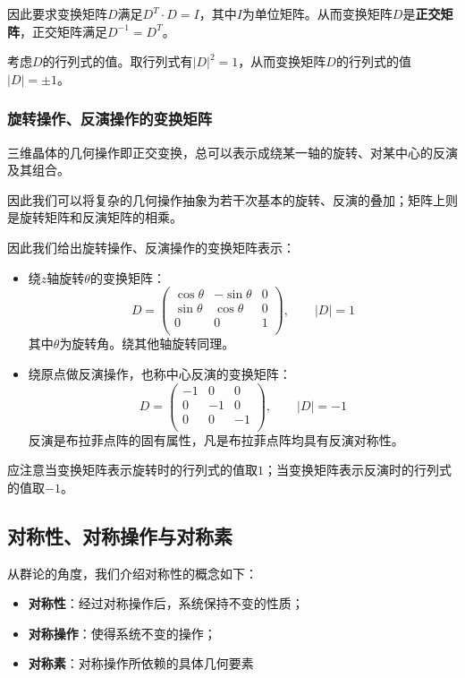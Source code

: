     因此要求变换矩阵$D$满足$D^T\cdot D = I$，其中$I$为单位矩阵。从而变换矩阵$D$是\textbf{正交矩阵}，正交矩阵满足$D^{-1}=D^T$。

    考虑$D$的行列式的值。取行列式有$\left\lvert D\right\rvert^2=1$，从而变换矩阵$D$的行列式的值$\left\lvert D\right\rvert= \pm 1$。

\subsubsection{旋转操作、反演操作的变换矩阵}
    三维晶体的几何操作即正交变换，总可以表示成绕某一轴的旋转、对某中心的反演及其组合。
    
    因此我们可以将复杂的几何操作抽象为若干次基本的旋转、反演的叠加；矩阵上则是旋转矩阵和反演矩阵的相乘。

    因此我们给出旋转操作、反演操作的变换矩阵表示：
    \begin{itemize}[itemsep=0pt,parsep=0pt]
        \item 
        绕$z$轴旋转$\theta$的变换矩阵：
        \[
        D=
        \left(
        \begin{array}{ccc}
            \cos\theta & -\sin\theta & 0 \\
            \sin\theta & \cos\theta  & 0 \\
            0          & 0           & 1 \\
        \end{array}
        \right)
        ,\qquad\left\lvert D\right\rvert= 1
        \]
        其中$\theta$为旋转角。绕其他轴旋转同理。
        \item 
        绕原点做反演操作，也称中心反演的变换矩阵：
        \[
        D=
        \left(
        \begin{array}{ccc}
            -1 & 0 & 0 \\
            0 & -1 & 0 \\
            0 & 0 & -1 \\
        \end{array}
        \right)
        ,\qquad\left\lvert D\right\rvert= -1
        \]
        反演是布拉菲点阵的固有属性，凡是布拉菲点阵均具有反演对称性。
    \end{itemize}
    应注意当变换矩阵表示旋转时的行列式的值取$1$；当变换矩阵表示反演时的行列式的值取$-1$。

\subsection{对称性、对称操作与对称素}
    从群论的角度，我们介绍对称性的概念如下：
    \begin{itemize}[itemsep=0pt,parsep=0pt]
        \item \textbf{对称性}：经过对称操作后，系统保持不变的性质；
        \item \textbf{对称操作}：使得系统不变的操作；
        \item \textbf{对称素}：对称操作所依赖的具体几何要素
    \end{itemize}

